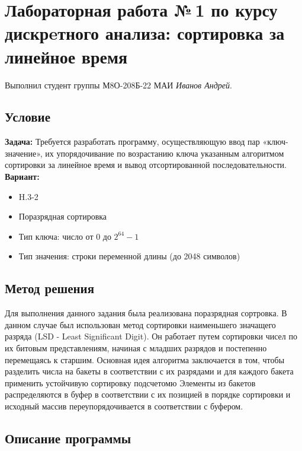 \documentclass[12pt]{article}
\begin{document}
\section*{Лабораторная работа №\,1 по курсу дискрeтного анализа: сортировка за линейное время}

Выполнил студент группы М8О-208Б-22 МАИ \textit{Иванов Андрей}.

\subsection*{Условие}

\textbf{Задача:}
Требуется разработать программу, осуществляющую ввод пар «ключ-значение», их упорядочивание по возрастанию ключа указанным алгоритмом сортировки за линейное время и вывод отсортированной последовательности.\newline
\newline
\textbf{Вариант:}
\begin{itemize}
    \item H.3-2
    \item Поразрядная сортировка
    \item Тип ключа: число от 0 до $2^{64} - 1$
    \item Тип значения: строки переменной длины (до 2048 символов)
\end{itemize}


\subsection*{Метод решения}

Для выполнения данного задания была реализована поразрядная сортровка. В данном случае был использован  метод сортировки наименьшего значащего разряда (LSD - Least Significant Digit). Он работает путем сортировки чисел по их битовым представлениям, начиная с младших разрядов и постепенно перемещаясь к старшим.
Основная идея алгоритма заключается в том, чтобы разделить числа на бакеты в соответствии с их разрядами и для каждого бакета применить устойчивую сортировку подсчетомю Элементы из бакетов распределяются в буфер в соответствии с их позицией в порядке сортировки и исходный массив переупорядочивается в соответствии с буфером.

\subsection*{Описание программы}
\end{document}

